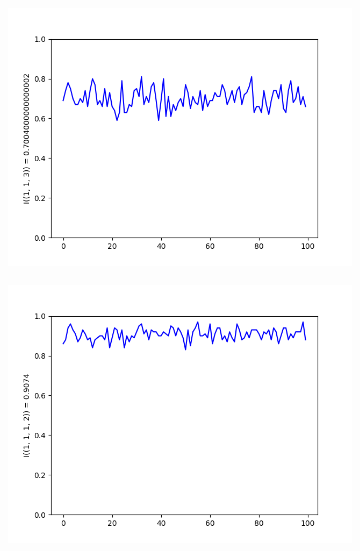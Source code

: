 \documentclass{llncs}
\begin{document}
\begin{figure}
\begin{subfigure}{0.5\linewidth}
\centering\includegraphics[scale=0.4]{images/1-1-3-consistent-partitions-probability.png}
\end{subfigure}
\begin{subfigure}{0.5\linewidth}
\centering\includegraphics[scale=0.4]{images/1-1-1-2-consistent-partitions-probability.png}
\end{subfigure}
\end{figure}

\newpage
\end{document}
